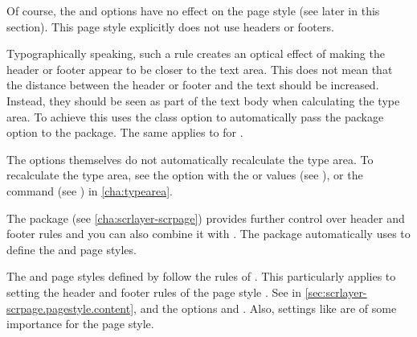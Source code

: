 Of course, the  and  options have no
effect on the %
 page style (see later in this
section). This page style explicitly does not use headers or footers.

Typographically speaking, such a rule creates an
optical effect of making the header or footer appear to be closer to the text
area. This does not mean that the distance between the header or footer and
the text should be increased. Instead, they should be seen as part of the text
body when calculating the type area. To achieve this
 uses the  class option to automatically
pass the %
 package option to the
\hyperref[cha:typearea]{} package. The same applies to
  for
%
.

The options themselves do not automatically recalculate the type area. To
recalculate the type area, see the  option with
the  or  values (see
), or the
 command (see
) in \autoref{cha:typearea}.

The \hyperref[cha:scrlayer-scrpage]{}%
%
package (see \autoref{cha:scrlayer-scrpage}) provides further control over
header and footer rules and you can also combine it with . The
 package automatically uses
 to
define the  and
 page styles.

The  and
 page styles defined by
 follow the rules of
\hyperref[cha:scrlayer-scrpage]{}. This particularly
applies to setting the header and footer rules of the  page
style . See in
\autoref{sec:scrlayer-scrpage.pagestyle.content},
 and
 the options
 and
. Also, settings like
 are of some importance for the
 page style.%
%
\EndIndexGroup


